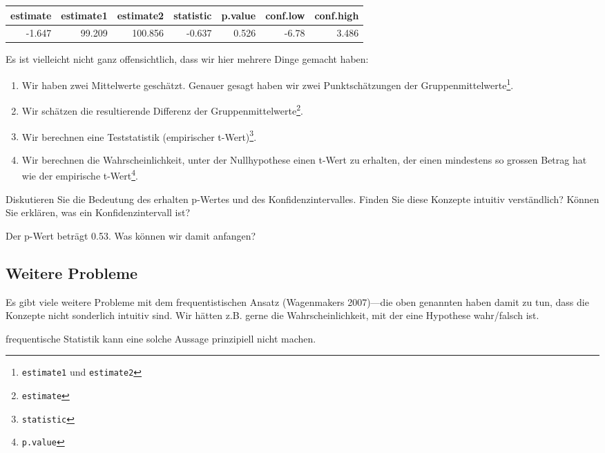 \documentclass[]{tufte-handout}
\begin{document}
\begin{table}
\centering
\begin{tabular}[t]{r|r|r|r|r|r|r}
\hline
estimate & estimate1 & estimate2 & statistic & p.value & conf.low & conf.high\\
\hline
-1.647 & 99.209 & 100.856 & -0.637 & 0.526 & -6.78 & 3.486\\
\hline
\end{tabular}
\end{table}

Es ist vielleicht nicht ganz offensichtlich, dass wir hier mehrere Dinge
gemacht haben:

\begin{enumerate}
\def\labelenumi{\arabic{enumi})}
\item
  Wir haben zwei Mittelwerte geschätzt. Genauer gesagt haben wir zwei
  Punktschätzungen der Gruppenmittelwerte\footnote{\texttt{estimate1}
    und \texttt{estimate2}}.
\item
  Wir schätzen die resultierende Differenz der
  Gruppenmittelwerte\footnote{\texttt{estimate}}.
\item
  Wir berechnen eine Teststatistik (empirischer t-Wert)\footnote{\texttt{statistic}}.
\item
  Wir berechnen die Wahrscheinlichkeit, unter der Nullhypothese einen
  t-Wert zu erhalten, der einen mindestens so grossen Betrag hat wie der
  empirische t-Wert\footnote{\texttt{p.value}}.
\end{enumerate}

Diskutieren Sie die Bedeutung des erhalten p-Wertes und des
Konfidenzintervalles. Finden Sie diese Konzepte intuitiv verständlich?
Können Sie erklären, was ein Konfidenzintervall ist?

Der p-Wert beträgt 0.53. Was können wir damit anfangen?

\hypertarget{weitere-probleme}{%
\subsection{Weitere Probleme}\label{weitere-probleme}}

Es gibt viele weitere Probleme mit dem frequentistischen Ansatz
(Wagenmakers 2007)---die oben genannten haben damit zu tun, dass die
Konzepte nicht sonderlich intuitiv sind. Wir hätten z.B. gerne die
Wahrscheinlichkeit, mit der eine Hypothese wahr/falsch ist.

frequentische Statistik kann eine solche Aussage prinzipiell nicht
machen.
\end{document}

